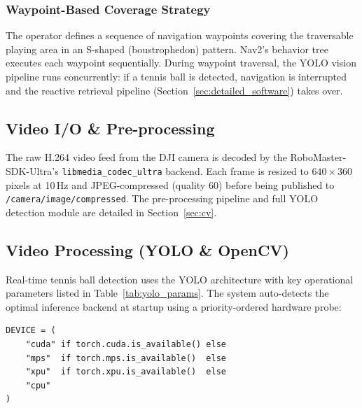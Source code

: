 \subsubsection{Waypoint-Based Coverage Strategy}

The operator defines a sequence of navigation waypoints covering the traversable playing area in an S-shaped (boustrophedon) pattern. Nav2's behavior tree executes each waypoint sequentially. During waypoint traversal, the YOLO vision pipeline runs concurrently: if a tennis ball is detected, navigation is interrupted and the reactive retrieval pipeline (Section~\ref{sec:detailed_software}) takes over.


\subsection{Video I/O \& Pre-processing}
\label{sec:preprocessing}

The raw H.264 video feed from the DJI camera is decoded by the RoboMaster-SDK-Ultra's \texttt{libmedia\_codec\_ultra} backend. Each frame is resized to $640\times360$ pixels at 10\,Hz and JPEG-compressed (quality 60) before being published to \texttt{/camera/image/compressed}. The pre-processing pipeline and full YOLO detection module are detailed in Section~\ref{sec:cv}.


\subsection{Video Processing (YOLO \& OpenCV)}
\label{sec:video-processing}

Real-time tennis ball detection uses the YOLO architecture with key operational parameters listed in Table~\ref{tab:yolo_params}. The system auto-detects the optimal inference backend at startup using a priority-ordered hardware probe:

\begin{verbatim}
DEVICE = (
    "cuda" if torch.cuda.is_available() else
    "mps"  if torch.mps.is_available()  else
    "xpu"  if torch.xpu.is_available()  else
    "cpu"
)
\end{verbatim}

